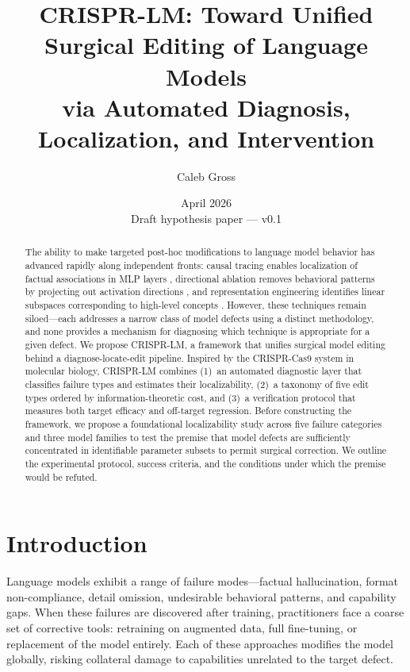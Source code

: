 \documentclass[11pt]{article}
\title{CRISPR-LM: Toward Unified Surgical Editing of Language Models\\via Automated Diagnosis, Localization, and Intervention}
\author{Caleb Gross}
\date{April 2026 \\ \vspace{0.5em} \small Draft hypothesis paper --- v0.1}
\begin{document}
\maketitle

\begin{abstract}
The ability to make targeted post-hoc modifications to language model behavior has advanced rapidly along independent fronts: causal tracing enables localization of factual associations in MLP layers \citep{meng2022locating}, directional ablation removes behavioral patterns by projecting out activation directions \citep{arditi2024refusal}, and representation engineering identifies linear subspaces corresponding to high-level concepts \citep{zou2023representation}. However, these techniques remain siloed---each addresses a narrow class of model defects using a distinct methodology, and none provides a mechanism for diagnosing which technique is appropriate for a given defect. We propose CRISPR-LM, a framework that unifies surgical model editing behind a diagnose-locate-edit pipeline. Inspired by the CRISPR-Cas9 system in molecular biology, CRISPR-LM combines (1)~an automated diagnostic layer that classifies failure types and estimates their localizability, (2)~a taxonomy of five edit types ordered by information-theoretic cost, and (3)~a verification protocol that measures both target efficacy and off-target regression. Before constructing the framework, we propose a foundational localizability study across five failure categories and three model families to test the premise that model defects are sufficiently concentrated in identifiable parameter subsets to permit surgical correction. We outline the experimental protocol, success criteria, and the conditions under which the premise would be refuted.
\end{abstract}

\section{Introduction}

Language models exhibit a range of failure modes---factual hallucination, format non-compliance, detail omission, undesirable behavioral patterns, and capability gaps. When these failures are discovered after training, practitioners face a coarse set of corrective tools: retraining on augmented data, full fine-tuning, or replacement of the model entirely. Each of these approaches modifies the model globally, risking collateral damage to capabilities unrelated to the target defect.
\end{document}
